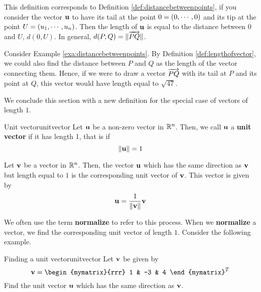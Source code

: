 This definition corresponds to Definition
\ref{def:distancebetweenpoints}, if you consider the vector $\mbox{\bf u}$
to have its tail at the point $0 = \left(0, \cdots ,0 \right)$ and its
tip at the point $U = \left(u_1, \cdots, u_n \right)$.  Then the length of
$\mbox{\bf u}$ is equal to the distance between $0$ and $U$, $d(0,U)$. In general, $d(P,Q) = \|\overrightarrow{PQ}\|$. 

Consider Example \ref{exa:distancebetweenpoints}. By Definition \ref{def:lengthofvector}, we could also find the distance between $P$ and $Q$ 
as the length of the vector connecting them. Hence, if we were to draw a vector $\overrightarrow{PQ}$ 
with its tail at $P$ and its point at $Q$, this vector would have length equal to 
$\sqrt{47}$.

We conclude this section with a new definition for the special case of
vectors of length $1$.

\begin{definition}{Unit vector}{unitvector}
Let $\mbox{\bf u}$ be a non-zero vector in $\mathbb{R}^{n}$. Then, we call $\mbox{\bf u}$ a 
\textbf{unit vector} if it has length 1, that is if
\begin{equation*}
\|\mbox{\bf u}\|
=
1
\end{equation*}
\end{definition}

Let $\mbox{\bf v}$ be a vector in $\mathbb{R}^{n}$. Then, the vector $\mbox{\bf u}$
which has the same direction as $\mbox{\bf v}$ but length equal to $1$ is the corresponding unit vector of $\mbox{\bf v}$. 
This vector is given by
\begin{equation*}
\mbox{\bf u}
=
\frac{1}{\|\mbox{\bf v}\|}
\mbox{\bf v}
\end{equation*}

We often use the term \textbf{normalize} to refer to this process. When we \textbf{normalize} a vector, we find the corresponding unit vector of length $1$. 
Consider the following example.

\begin{example}{Finding a unit vector}{unitvector}
Let $\mbox{\bf v}$ be given by 
\begin{equation*}
\vect{v}
=
\begin{mymatrix}{rrr}
1 & -3 & 4
\end{mymatrix}^T
\end{equation*}
Find the unit vector $\mbox{\bf u}$ which has the same direction as $\mbox{\bf v}$.
\end{example}

